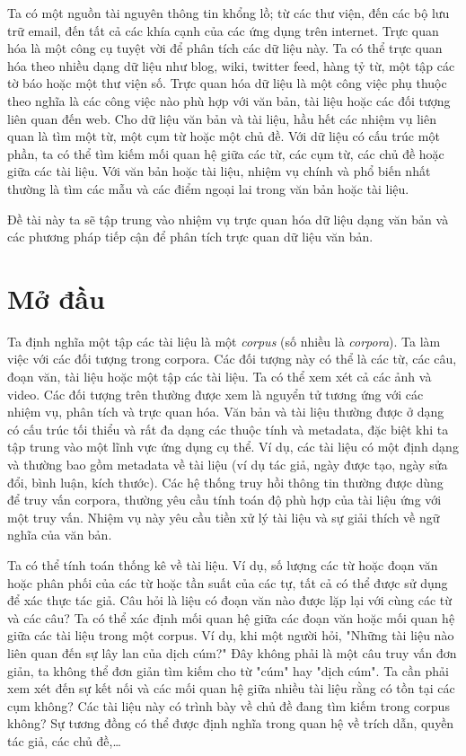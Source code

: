\documentclass[14pt, a4paper]{article}
\numberwithin{equation}{section}
\numberwithin{figure}{section}
\numberwithin{dl}{section}
\numberwithin{md}{section}
\numberwithin{bd}{section}
\numberwithin{dn}{section}
\numberwithin{hq}{section}
\begin{document}
    Ta có một nguồn tài nguyên thông tin khổng lồ; từ các thư viện, đến các bộ lưu trữ email,
    đến tất cả các khía cạnh của các ứng dụng trên internet.
    Trực quan hóa là một công cụ tuyệt vời để phân tích các dữ liệu này.
    Ta có thể trực quan hóa theo nhiều dạng dữ liệu như blog, wiki, twitter feed,
    hàng tỷ từ, một tập các tờ báo hoặc một thư viện số.
    Trực quan hóa dữ liệu là một công việc phụ thuộc theo nghĩa là các công việc nào phù hợp với văn bản, tài liệu hoặc các đối tượng liên quan đến web.
    Cho dữ liệu văn bản và tài liệu, hầu hết các nhiệm vụ liên quan là tìm một từ, một cụm từ hoặc một chủ đề.
    Với dữ liệu có cấu trúc một phần, ta có thể tìm kiếm mối quan hệ giữa các từ, các cụm từ, các chủ đề hoặc giữa các tài liệu.
    Với văn bản hoặc tài liệu, nhiệm vụ chính và phổ biến nhất thường là tìm các mẫu và các điểm ngoại lai trong văn bản hoặc tài liệu.

    Đề tài này ta sẽ tập trung vào nhiệm vụ trực quan hóa dữ liệu dạng văn bản và các phương pháp tiếp cận để phân tích trực quan dữ liệu văn bản.

    \newpage

    \section{Mở đầu}

    Ta định nghĩa một tập các tài liệu là một \textit{corpus} (số nhiều là \textit{corpora}).
    Ta làm việc với các đối tượng trong corpora.
    Các đối tượng này có thể là các từ, các câu, đoạn văn, tài liệu hoặc một tập các tài liệu.
    Ta có thể xem xét cả các ảnh và video.
    Các đối tượng trên thường được xem là nguyển tử tương ứng với các nhiệm vụ, phân tích và trực quan hóa.
    Văn bản và tài liệu thường được ở dạng có cấu trúc tối thiểu và rất đa dạng các thuộc tính và metadata,
    đặc biệt khi ta tập trung vào một lĩnh vực ứng dụng cụ thể.
    Ví dụ, các tài liệu có một định dạng và thường bao gồm metadata về tài liệu (ví dụ tác giả, ngày được tạo, ngày sửa đổi, bình luận, kích thước).
    Các hệ thống truy hồi thông tin thường được dùng để truy vấn corpora, thường yêu cầu tính toán độ phù hợp của tài liệu ứng với một truy vấn.
    Nhiệm vụ này yêu cầu tiền xử lý tài liệu và sự giải thích về ngữ nghĩa của văn bản.

    Ta có thể tính toán thống kê về tài liệu.
    Ví dụ, số lượng các từ hoặc đoạn văn hoặc phân phối của các từ hoặc tần suất của các tự, tất cả có thể được sử dụng để xác thực tác giả.
    Câu hỏi là liệu có đoạn văn nào được lặp lại với cùng các từ và các câu?
    Ta có thể xác định mối quan hệ giữa các đoạn văn hoặc mối quan hệ giữa các tài liệu trong một corpus.
    Ví dụ, khi một người hỏi, "Những tài liệu nào liên quan đến sự lây lan của dịch cúm?"
    Đây không phải là một câu truy vấn đơn giản, ta không thể đơn giản tìm kiếm cho từ "cúm" hay "dịch cúm".
    Ta cần phải xem xét đến sự kết nối và các mối quan hệ giữa nhiều tài liệu rằng có tồn tại các cụm không?
    Các tài liệu này có trình bày về chủ đề đang tìm kiếm trong corpus không?
    Sự tương đồng có thể được định nghĩa trong quan hệ về trích dẫn, quyền tác giả, các chủ đề,\dots
\end{document}
